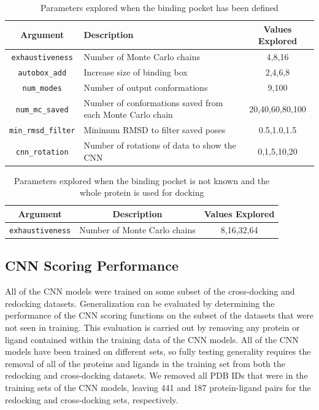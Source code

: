 \documentclass[journal=jcisd8,manuscript=article]{achemso}
\begin{document}
\begin{table}[]
    \centering
    \begin{tabular}{|c|p{}|c|}
        \hline Argument & Description & Values Explored \\ \hline
         \texttt{exhaustiveness} & Number of Monte Carlo chains & 4,8,16 \\ \hline
         \texttt{autobox\_add} & Increase size of binding box & 2,4,6,8 \\ \hline
         \texttt{num\_modes} & Number of output conformations & 9,100 \\ \hline
         \texttt{num\_mc\_saved} & Number of conformations saved from each Monte Carlo chain & 20,40,60,80,100 \\ \hline
         \texttt{min\_rmsd\_filter} & Minimum RMSD to filter saved poses & 0.5,1.0,1.5 \\ \hline
         \texttt{cnn\_rotation} & Number of rotations of data to show the CNN & 0,1,5,10,20 \\ \hline
    \end{tabular}
    \caption{Parameters explored when the binding pocket has been defined}
    \label{tab:SettingsExplPocket}
\end{table}

\begin{table}[]
    \centering
    \begin{tabular}{|c|c|c|}
        \hline Argument & Description & Values Explored \\ \hline
         \texttt{exhaustiveness} & Number of Monte Carlo chains & 8,16,32,64 \\ \hline
    \end{tabular}
    \caption{Parameters explored when the binding pocket is not known and the whole protein is used for docking}
    \label{tab:SettingsExplWP}
\end{table}

\subsection{CNN Scoring Performance}
All of the CNN models were trained on some subset of the cross-docking and redocking datasets. Generalization can be evaluated by determining the performance of the CNN scoring functions on the subset of the datasets that were not seen in training. This evaluation is carried out by removing any protein or ligand contained within the training data of the CNN models. All of the CNN models have been trained on different sets, so fully testing generality requires the removal of all of the proteins and ligands in the training set from both the redocking and cross-docking datasets. We removed all PDB IDs that were in the training sets of the CNN models\cite{liu2017forging,francoeur2020three}, leaving 441 and 187 protein-ligand pairs for the redocking and cross-docking sets, respectively.
\end{document}
